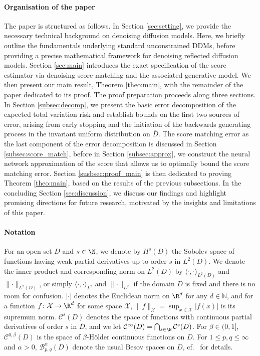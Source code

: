 \documentclass[a4paper, 11pt, headings = small, abstract]{scrartcl}
\begin{document}
\paragraph{Organisation of the paper} 
The paper is structured as follows. In Section \ref{sec:setting}, we provide the necessary technical background on denoising diffusion models. Here, we briefly outline the fundamentals underlying standard unconstrained DDMs, before providing a precise mathematical framework for denoising reflected diffusion models. Section \ref{sec:main} introduces the exact specification of the score estimator via denoising score matching and the associated generative model. We then present our main result, Theorem \ref{theo:main}, with the remainder of the paper dedicated to its proof. The proof preparation proceeds along three sections. In Section \ref{subsec:decomp}, we present the basic error decomposition of the expected total variation risk and establish bounds on the first two sources of error, arising from early stopping and the initiation of the backwards generating process in the invariant uniform distribution on $\overline{D}$. The score matching error as the last component of the error decomposition is discussed in Section \ref{subsec:score_match}, before in Section \ref{subsec:approx}, we construct the neural network approximation of the score that allows us to optimally bound the score matching error. Section \ref{susbsec:proof_main} is then dedicated to proving Theorem \ref{theo:main}, based on the results of the previous subsections. 
In the concluding Section \ref{sec:discussion}, we discuss our findings and highlight promising directions for future research, motivated by the insights and limitations of this paper.


\paragraph{Notation} 
For an open set $D$ and $s \in \N$, we denote by $H^s(D)$ the Sobolev space of functions having weak partial derivatives up to order $s$ in $L^2(D)$. We denote the inner product and corresponding norm on $L^2(D)$ by $\langle \cdot , \cdot \rangle_{L^2(D)}$ and $\lVert \cdot \rVert_{L^2(D)}$, or simply $\langle \cdot , \cdot \rangle_{L^2}$ and $\lVert \cdot \rVert_{L^2}$ if the domain $D$ is fixed and there is no room for confusion. $\lvert \cdot \rvert$ denotes the Euclidean norm on $\R^d$ for any $d \in \mathbb{N}$, and for a function $f\colon \mathcal{X} \to \R^d$ for some space $\mathcal{X}$, $\lVert f \rVert_{\mathcal{X}} = \sup_{x \in \mathcal{X}} \lvert f(x) \rvert$ is its supremum norm.  $\mathcal{C}^s(D)$ denotes the space of functions with continuous partial derivatives of order $s$ in $\overline{D}$, and we let $\mathcal{C}^\infty(D) = \bigcap_{s \in \N} \mathcal{C}^s(D)$. For $\beta \in (0,1]$, $\mathcal{C}^{0,\beta}(D)$ is the space of $\beta$-Hölder continuous functions on $D$. For $1\leq p,q \leq \infty$ and $\alpha > 0$, $\mathcal{B}^\alpha_{p,q}(D)$ denote the usual Besov spaces on $D$, cf.\ \cite{triebel10} for details.
\end{document}
